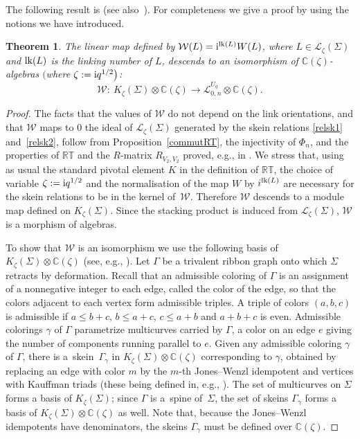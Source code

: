 \documentclass[pdftex]{sigma}%
\numberwithin{equation}{section}
\numberwithin{figure}{section}
\newtheorem{teo}{Theorem}[section]
\newcommand{\mc}{\mathbb{C}}
\newcommand{\Ll}{{\mathcal L}}
\newcommand{\ra}{\rightarrow}
\begin{document}
The following result is \cite[Theorem~1]{BFK2} (see also~\cite[Theorem~10]{BFK}). For completeness we give a proof by using the notions we have introduced.
\begin{teo}\label{teoCharlie}
The linear map defined by $\mathcal{W}(L) = {\rm i}^{{\rm lk}(L)}W(L)$, where $L\in \mathcal{L}_\zeta(\Sigma)$ and ${\rm lk}(L)$ is the linking number of $L$, descends to an isomorphism of $\mc(\zeta)$-algebras $\big($where $\zeta := {\rm i}q^{1/2}\big)$:
\[
\mathcal{W}\colon\ K_\zeta(\Sigma)\otimes \mc(\zeta)\ra \Ll_{0,n}^{U_q}\otimes \mc(\zeta).
\]
\end{teo}

\begin{proof}
The facts that the values of $\mathcal{W}$ do not depend on the link orientations, and that $\mathcal{W}$ maps to $0$ the ideal of $\mathcal{L}_\zeta(\Sigma)$ generated by the skein relations \eqref{relsk1} and~\eqref{relsk2}, follow from Proposition~\ref{commutRT}, the injectivity of $\Phi_n$, and the properties of $\mathbb{RT}$ and the $R$-matrix $R_{V_2,V_2}$ proved, e.g., in \cite[Lemma 3.18, Theorem 4.3 and Corollary 4.13]{KM}. We stress that, using as usual the standard pivotal element $K$ in the definition of $\mathbb{RT}$, the choice of variable $\zeta := {\rm i}q^{1/2}$ and the normalisation of the map $W$ by $i^{{\rm lk}(L)}$ are necessary for the skein relations to be in the kernel of~$\mathcal{W}$. Therefore $\mathcal{W}$ descends to a module map defined on $K_\zeta(\Sigma)$. Since the stacking product is induced from $\mathcal{L}_\zeta(\Sigma)$, $\mathcal{W}$ is a morphism of algebras.


To show that $\mathcal{W}$ is an isomorphism we use the following basis of $K_\zeta(\Sigma)\otimes \mc(\zeta)$ (see, e.g., \cite{KLins,Lick}). Let $\Gamma$ be a trivalent ribbon graph onto which $\Sigma$ retracts by deformation. Recall that an admissible coloring of $\Gamma$ is an assignment of a nonnegative integer to each edge, called the color of the edge, so that the colors adjacent to each vertex form admissible triples. A triple of colors $(a,b,c)$ is admissible if $a\leq b+c$, $b \leq a+c$, $c \leq a+b$ and $a+b+c$ is even. Admissible colorings $\gamma$ of $\Gamma$ parametrize multicurves carried by $\Gamma$, a color on an edge $e$ giving the number of components running parallel to $e$. Given any admissible coloring $\gamma$ of $\Gamma$, there is a~skein~$\Gamma_\gamma$ in $K_\zeta(\Sigma)\otimes \mc(\zeta)$ corresponding to $\gamma$, obtained by replacing an edge with color $m$ by the $m$-th Jones--Wenzl idempotent and vertices with Kauffman triads (these being defined in, e.g., \cite[p.~136 and Figure~14.7]{Lick}). The set of multicurves on $\Sigma$ forms a basis of $K_\zeta(\Sigma)$; since $\Gamma$ is a~spine of~$\Sigma$, the set of skeins $\Gamma_\gamma$ forms a basis of $K_\zeta(\Sigma)\otimes \mc(\zeta)$ as well. Note that, because the Jones--Wenzl idempotents have denominators, the skeins $\Gamma_\gamma$ must be defined over $\mc(\zeta)$.


\end{proof}
\end{document}
